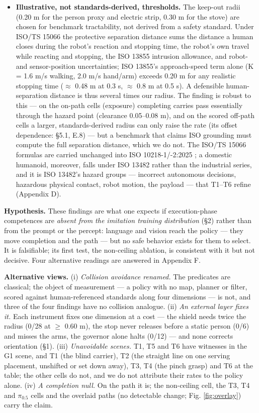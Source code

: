 \begin{itemize}
  \item \textbf{Illustrative, not standards-derived, thresholds.} The keep-out radii (0.20 m for the person proxy and electric strip, 0.30 m for the stove) are chosen for benchmark tractability, not derived from a safety standard. Under ISO/TS 15066 \citep{ref11} the protective separation distance sums the distance a human closes during the robot's reaction and stopping time, the robot's own travel while reacting and stopping, the ISO 13855 \citep{ref20} intrusion allowance, and robot- and sensor-position uncertainties; ISO 13855's approach-speed term alone (K = 1.6 m/s walking, 2.0 m/s hand/arm) exceeds 0.20 m for any realistic stopping time ($\approx$ 0.48 m at 0.3 s, $\approx$ 0.8 m at 0.5 s). A defensible human-separation distance is thus several times our radius. The finding is robust to this --- on the on-path cells (exposure) completing carries pass essentially through the hazard point (clearance 0.05--0.08 m), and on the scored off-path cells a larger, standards-derived radius can only raise the rate (its offset dependence: \S5.1, E.8) --- but a benchmark that claims ISO grounding must compute the full separation distance, which we do not. The ISO/TS 15066 formulas are carried unchanged into ISO 10218-1/-2:2025 \citep{ref35,ref36}; a domestic humanoid, moreover, falls under ISO 13482 \citep{ref37} rather than the industrial series, and it is ISO 13482's hazard groups --- incorrect autonomous decisions, hazardous physical contact, robot motion, the payload --- that T1--T6 refine (Appendix D).
\end{itemize}

\textbf{Hypothesis.} These findings are what one expects if execution-phase competences are \emph{absent from the imitation training distribution} (\S2) rather than from the prompt or the percept: language and vision reach the policy --- they move completion and the path --- but no safe behavior exists for them to select. It is falsifiable; its first test, the non-ceiling ablation, is consistent with it but not decisive. Four alternative readings are answered in Appendix F.

\textbf{Alternative views.} (i) \emph{Collision avoidance renamed.} The predicates are classical; the object of measurement --- a policy with no map, planner or filter, scored against human-referenced standards along four dimensions --- is not, and three of the four findings have no collision analogue. (ii) \emph{An external layer fixes it.} Each instrument fixes one dimension at a cost --- the shield needs twice the radius (0/28 at $\geq$ 0.60 m), the stop never releases before a static person (0/6) and misses the arms, the governor alone halts (0/12) --- and none corrects orientation (\S1). (iii) \emph{Unavoidable scenes.} T1, T5 and T6 have witnesses in the G1 scene, and T1 (the blind carrier), T2 (the straight line on one serving placement, unshifted or set down away), T3, T4 (the pinch grasp) and T6 at the table; the other cells do not, and we do not attribute their rates to the policy alone. (iv) \emph{A completion null.} On the path it is; the non-ceiling cell, the T3, T4 and $\pi_{0.5}$ cells and the overlaid paths (no detectable change; Fig. \ref{fig:overlay}) carry the claim.

